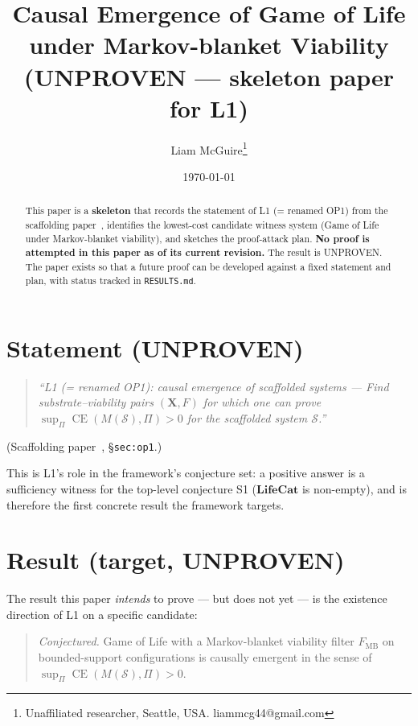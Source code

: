 \documentclass[11pt]{article}
\title{Causal Emergence of Game of Life under Markov-blanket Viability \\
       \large (UNPROVEN --- skeleton paper for L1)}
\author{Liam McGuire\thanks{Unaffiliated researcher, Seattle, USA. liammcg44@gmail.com}}
\date{\today}
\theoremstyle{plain}
\theoremstyle{definition}
\theoremstyle{remark}
\DeclareMathOperator{\CE}{CE}
\newcommand{\X}{\mathbf{X}}
\begin{document}
\maketitle

\begin{abstract}
This paper is a \textbf{skeleton} that records the statement of L1
(= renamed OP1) from the scaffolding paper~\cite{emergent_systems_2026},
identifies the lowest-cost candidate witness system
(Game of Life under Markov-blanket viability), and sketches the
proof-attack plan. \textbf{No proof is attempted in this paper as of
its current revision.} The result is UNPROVEN. The paper exists so
that a future proof can be developed against a fixed statement and
plan, with status tracked in \texttt{RESULTS.md}.
\end{abstract}

\section{Statement (UNPROVEN)}

\begin{quote}
\emph{``L1 (= renamed OP1): causal emergence of scaffolded systems ---
Find substrate--viability pairs $(\X, F)$ for which one can prove
$\sup_\Pi \CE(M(\mathcal{S}), \Pi) > 0$ for the scaffolded system
$\mathcal{S}$.''}
\end{quote}

\noindent (Scaffolding paper~\cite{emergent_systems_2026},
\S\texttt{sec:op1}.)

This is L1's role in the framework's conjecture set: a positive
answer is a sufficiency witness for the top-level conjecture S1
($\mathbf{LifeCat}$ is non-empty), and is therefore the first
concrete result the framework targets.

\section{Result (target, UNPROVEN)}

The result this paper \emph{intends} to prove --- but does not yet ---
is the existence direction of L1 on a specific candidate:

\begin{quote}
\emph{Conjectured.} Game of Life with a Markov-blanket viability filter
$F_{\mathrm{MB}}$ on bounded-support configurations is causally
emergent in the sense of $\sup_\Pi \CE(M(\mathcal{S}), \Pi) > 0$.
\end{quote}
\end{document}
